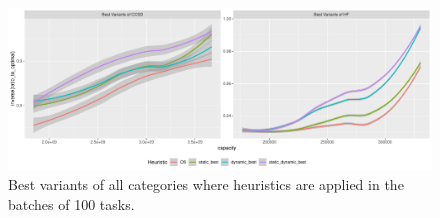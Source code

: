 \documentclass[sigconf]{acmart}
\begin{document}
{		
\begin{figure}[htb]
		\includegraphics[scale=0.5]{./results/plots/inverse_ratio_to_optimal_batch-best.pdf}
	\caption{Best variants of all categories where heuristics are applied in the batches of 100 tasks.}
	\label{fig:best_variants_batch}
\end{figure}
	
	
		
		
		
}
\end{document}
